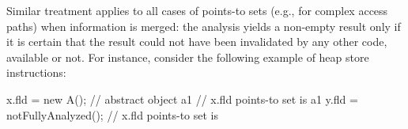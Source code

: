 




Similar treatment applies to all cases of points-to sets (e.g., for
complex access paths) when information is merged: the analysis yields
a non-empty result only if it is certain that the result could not have
been invalidated by any other code, available or not.
For instance, consider the following example of heap store
instructions:

\vspace{-3mm}\begin{minipage}[l]{5.1in}
\begin{javacode}
x.fld = new A();  // abstract object a1
 // x.fld points-to set is {a1}
y.fld = notFullyAnalyzed();
 // x.fld points-to set is {}
\end{javacode}
\end{minipage}

